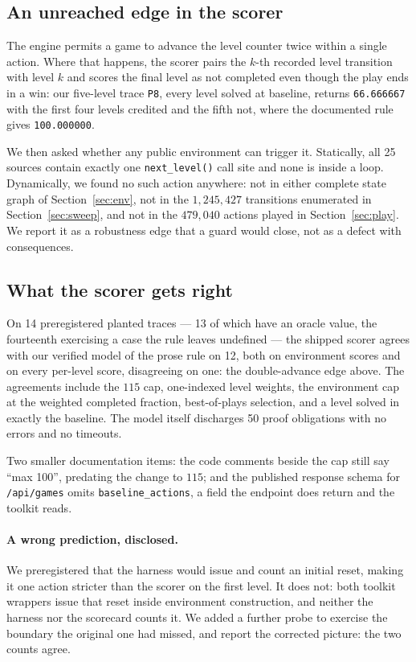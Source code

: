 \documentclass[11pt]{article}
\newcommand{\code}[1]{\texttt{#1}}
\begin{document}
\subsection{An unreached edge in the scorer}

The engine permits a game to advance the level counter twice within a single
action. Where that happens, the scorer pairs the $k$-th recorded level
transition with level $k$ and scores the final level as not completed even
though the play ends in a win: our five-level trace \code{P8}, every level solved at baseline, returns
\code{66.666667} with the first four levels credited and the fifth not,
where the documented rule gives \code{100.000000}.

We then asked whether any public environment can trigger it. Statically, all 25
sources contain exactly one \code{next\_level()} call site and none is inside a
loop. Dynamically, we found no such action anywhere: not in either complete
state graph of Section~\ref{sec:env}, not in the $1{,}245{,}427$ transitions
enumerated in Section~\ref{sec:sweep}, and not in the $479{,}040$ actions played
in Section~\ref{sec:play}. We report it as a robustness edge that a guard would
close, not as a defect with consequences.

\subsection{What the scorer gets right}

On 14 preregistered planted traces --- 13 of which have an oracle value, the
fourteenth exercising a case the rule leaves undefined --- the shipped scorer
agrees with our verified model of the prose rule on 12, both on environment
scores and on every per-level score, disagreeing on one: the double-advance edge
above. The
agreements include the $115$ cap, one-indexed level weights, the environment cap
at the weighted completed fraction, best-of-plays selection, and a level solved
in exactly the baseline. The model itself discharges 50 proof obligations with
no errors and no timeouts.

Two smaller documentation items: the code comments beside the cap still say
``max 100'', predating the change to $115$; and the published response schema for
\code{/api/games} omits \code{baseline\_actions}, a field the endpoint does
return and the toolkit reads.

\paragraph{A wrong prediction, disclosed.} We preregistered that the harness
would issue and count an initial reset, making it one action stricter than the
scorer on the first level. It does not: both toolkit wrappers issue that reset
inside environment construction, and neither the harness nor the scorecard
counts it. We added a further probe to exercise the boundary the original one
had missed, and report the corrected picture: the two counts agree.
\end{document}
